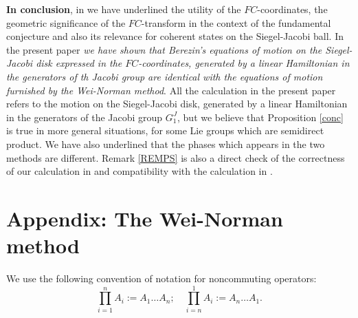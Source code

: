 \documentclass[12pt]{amsart}
\numberwithin{equation}{section}
\theoremstyle{definition}
\begin{document}
{\bf In conclusion}, in \cite{nou,FC,ber14} we have underlined the utility 
of the $FC$-coordinates,  the geometric  significance of the 
$FC$-transform in the context of the fundamental conjecture and also
its relevance for coherent states on the Siegel-Jacobi ball. In the
present  paper {\it we have shown that Berezin's equations of motion
on the Siegel-Jacobi disk   expressed  in the $FC$-coordinates, 
generated by a linear Hamiltonian in the generators of th Jacobi group 
are identical with the equations of
motion furnished by the Wei-Norman method}. All the calculation in the
present paper refers to the motion on the Siegel-Jacobi disk,  generated
by  a linear Hamiltonian in the generators of the Jacobi group $G^J_1$, but we
believe  that  Proposition  \ref{conc} is  true in more general
situations,  for some Lie groups which are semidirect product. We have also underlined that the phases which appears
in the two  methods are different.  Remark
\ref{REMPS}  is also  a direct  check of the correctness of our calculation
in \cite{FC} and compatibility with the  calculation in \cite{cezar}. 

\section{Appendix: The Wei-Norman method}\label{app1}

We use the following convention of notation for noncommuting operators:
\begin{equation}\label{conv}
\prod_{i=1}^nA_i:=A_1\dots A_n; \quad\prod_{i=n}^1A_i:=A_n\dots A_1.
\end{equation}
\end{document}

